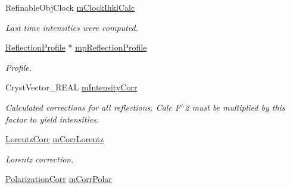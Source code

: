 \begin{DoxyCompactItemize}
\mbox{\label{class_obj_cryst_1_1_powder_pattern_diffraction_a4b583c1ab76b3b39b891050f85e7d1f5}} 
Refinable\+Obj\+Clock \mbox{\hyperlink{class_obj_cryst_1_1_powder_pattern_diffraction_a4b583c1ab76b3b39b891050f85e7d1f5}{m\+Clock\+Ihkl\+Calc}}
\begin{DoxyCompactList}\small\item\em Last time intensities were computed. \end{DoxyCompactList}\item 
\mbox{\label{class_obj_cryst_1_1_powder_pattern_diffraction_ac7f248f736457fe513193865d2e154ad}} 
\mbox{\hyperlink{class_obj_cryst_1_1_reflection_profile}{Reflection\+Profile}} $\ast$ \mbox{\hyperlink{class_obj_cryst_1_1_powder_pattern_diffraction_ac7f248f736457fe513193865d2e154ad}{mp\+Reflection\+Profile}}
\begin{DoxyCompactList}\small\item\em Profile. \end{DoxyCompactList}\item 
Cryst\+Vector\+\_\+\+R\+E\+AL \mbox{\hyperlink{class_obj_cryst_1_1_powder_pattern_diffraction_addc10ae4a02801eb441e38b4beae2e9a}{m\+Intensity\+Corr}}
\begin{DoxyCompactList}\small\item\em Calculated corrections for all reflections. Calc F$^\wedge$2 must be multiplied by this factor to yield intensities. \end{DoxyCompactList}\item 
\mbox{\label{class_obj_cryst_1_1_powder_pattern_diffraction_a7f83c3a22d2784ae9394ddd64e695088}} 
\mbox{\hyperlink{class_obj_cryst_1_1_lorentz_corr}{Lorentz\+Corr}} \mbox{\hyperlink{class_obj_cryst_1_1_powder_pattern_diffraction_a7f83c3a22d2784ae9394ddd64e695088}{m\+Corr\+Lorentz}}
\begin{DoxyCompactList}\small\item\em Lorentz correction. \end{DoxyCompactList}\item 
\mbox{\label{class_obj_cryst_1_1_powder_pattern_diffraction_a38474f1c77cbc2b08c2d4354f8f439d1}} 
\mbox{\hyperlink{class_obj_cryst_1_1_polarization_corr}{Polarization\+Corr}} \mbox{\hyperlink{class_obj_cryst_1_1_powder_pattern_diffraction_a38474f1c77cbc2b08c2d4354f8f439d1}{m\+Corr\+Polar}}

\end{DoxyCompactItemize}
